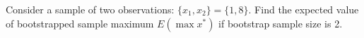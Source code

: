 
\begin{question}
Consider a sample of two observations: \(\{x_1,x_2\} = \{1, 8\}\). Find the expected value of bootstrapped sample maximum \(E(\max{x^*})\) if bootstrap sample size is 2.
\end{question}


